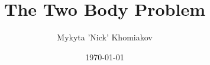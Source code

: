 \documentclass{article}
\title{The Two Body Problem}
\author{Mykyta 'Nick' Khomiakov}
\date{\today}
\begin{document}
\maketitle
\tableofcontents
\newpage






\FloatBarrier



\end{document}
